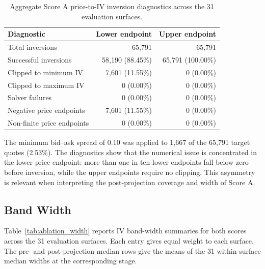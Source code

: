 \begin{table}[H]
\centering
\small
\begin{tabular}{|l|r|r|}
\hline
\textbf{Diagnostic} & \textbf{Lower endpoint} & \textbf{Upper endpoint} \\
\hline
Total inversions              & 65{,}791          & 65{,}791          \\
Successful inversions         & 58{,}190 (88.45\%) & 65{,}791 (100.00\%) \\
Clipped to minimum IV         & 7{,}601 (11.55\%)  & 0 (0.00\%)          \\
Clipped to maximum IV         & 0 (0.00\%)         & 0 (0.00\%)          \\
Solver failures               & 0 (0.00\%)         & 0 (0.00\%)          \\
Negative price endpoints      & 7{,}601 (11.55\%)  & 0 (0.00\%)          \\
Non-finite price endpoints    & 0 (0.00\%)         & 0 (0.00\%)          \\
\hline
\end{tabular}
\caption{Aggregate Score A price-to-IV inversion diagnostics across the 31 evaluation surfaces.}
\label{tab:score_a_inversion}
\end{table}

The minimum bid--ask spread of 0.10 was applied to 1{,}667 of the 65{,}791 target quotes (2.53\%). The diagnostics show that the numerical issue is concentrated in the lower price endpoint: more than one in ten lower endpoints fall below zero before inversion, while the upper endpoints require no clipping. This asymmetry is relevant when interpreting the post-projection coverage and width of Score A.

\subsection{Band Width}
\label{subsec:ablation_width}

Table~\ref{tab:ablation_width} reports IV band-width summaries for both scores across the 31 evaluation surfaces. Each entry gives equal weight to each surface. The pre- and post-projection median rows give the means of the 31 within-surface median widths at the corresponding stage.

